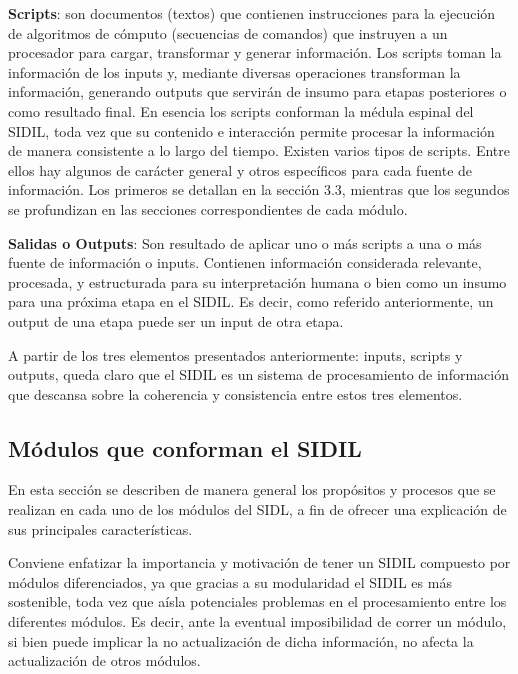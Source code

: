 \documentclass[
]{article}
\begin{document}
\textbf{Scripts}: son documentos (textos) que contienen instrucciones para la ejecución de algoritmos de cómputo (secuencias de comandos) que instruyen a un procesador para cargar, transformar y generar información. Los scripts toman la información de los inputs y, mediante diversas operaciones transforman la información, generando outputs que servirán de insumo para etapas posteriores o como resultado final. En esencia los scripts conforman la médula espinal del SIDIL, toda vez que su contenido e interacción permite procesar la información de manera consistente a lo largo del tiempo. Existen varios tipos de scripts. Entre ellos hay algunos de carácter general y otros específicos para cada fuente de información. Los primeros se detallan en la sección 3.3, mientras que los segundos se profundizan en las secciones correspondientes de cada módulo.

\textbf{Salidas o Outputs}: Son resultado de aplicar uno o más scripts a una o más fuente de información o inputs. Contienen información considerada relevante, procesada, y estructurada para su interpretación humana o bien como un insumo para una próxima etapa en el SIDIL. Es decir, como referido anteriormente, un output de una etapa puede ser un input de otra etapa.

A partir de los tres elementos presentados anteriormente: inputs, scripts y outputs, queda claro que el SIDIL es un sistema de procesamiento de información que descansa sobre la coherencia y consistencia entre estos tres elementos.

\hypertarget{modulosqueconformanSIDIL}{%
\subsection{Módulos que conforman el SIDIL}\label{modulosqueconformanSIDIL}}

En esta sección se describen de manera general los propósitos y procesos que se realizan en cada uno de los módulos del SIDL, a fin de ofrecer una explicación de sus principales características.

Conviene enfatizar la importancia y motivación de tener un SIDIL compuesto por módulos diferenciados, ya que gracias a su modularidad el SIDIL es más sostenible, toda vez que aísla potenciales problemas en el procesamiento entre los diferentes módulos. Es decir, ante la eventual imposibilidad de correr un módulo, si bien puede implicar la no actualización de dicha información, no afecta la actualización de otros módulos.
\end{document}
